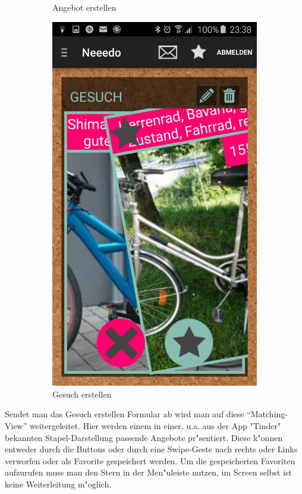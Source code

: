 \begin{figure}[H]
\begin{subfigure}{0.5\textwidth}
\caption{Angebot erstellen}
\label{fig:match1}
\end{subfigure}
\begin{subfigure}{0.5\textwidth}
\includegraphics[width=0.9\linewidth]{./Bilder/matching2.png}
\caption{Gesuch erstellen}
\label{fig:match2}
\end{subfigure}
\caption{}
\label{fig:image5}
\end{figure}

Sendet man das Gesuch erstellen Formular ab wird man auf diese \enquote{Matching-View} weitergeleitet. 
Hier werden einem in einer, u.a. aus der App "Tinder" bekannten Stapel-Darstellung passende Angebote pr"sentiert. Diese k"onnen entweder durch die Buttons oder durch eine Swipe-Geste nach rechts oder Links verworfen oder als Favorite gespeichert werden. 
Um die gespeicherten Favoriten aufzurufen muss man den Stern in der Men"uleiste nutzen, im Screen selbst ist keine Weiterleitung m"oglich. 

